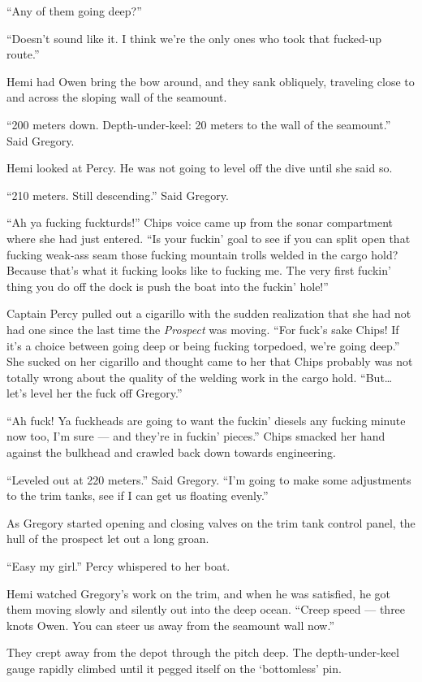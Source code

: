 \documentclass[
]{scrbook}
\begin{document}
``Any of them going deep?''

``Doesn't sound like it. I think we're the only ones who took that
fucked-up route.''

Hemi had Owen bring the bow around, and they sank obliquely, traveling
close to and across the sloping wall of the seamount.

``200 meters down. Depth-under-keel: 20 meters to the wall of the
seamount.'' Said Gregory.

Hemi looked at Percy. He was not going to level off the dive until she
said so.

``210 meters. Still descending.'' Said Gregory.

``Ah ya fucking fuckturds!'' Chips voice came up from the sonar
compartment where she had just entered. ``Is your fuckin' goal to see if
you can split open that fucking weak-ass seam those fucking mountain
trolls welded in the cargo hold? Because that's what it fucking looks
like to fucking me. The very first fuckin' thing you do off the dock is
push the boat into the fuckin' hole!''

Captain Percy pulled out a cigarillo with the sudden realization that
she had not had one since the last time the \emph{Prospect} was moving.
``For fuck's sake Chips! If it's a choice between going deep or being
fucking torpedoed, we're going deep.'' She sucked on her cigarillo and
thought came to her that Chips probably was not totally wrong about the
quality of the welding work in the cargo hold. ``But\ldots{} let's level
her the fuck off Gregory.''

``Ah fuck! Ya fuckheads are going to want the fuckin' diesels any
fucking minute now too, I'm sure --- and they're in fuckin' pieces.''
Chips smacked her hand against the bulkhead and crawled back down
towards engineering.

``Leveled out at 220 meters.'' Said Gregory. ``I'm going to make some
adjustments to the trim tanks, see if I can get us floating evenly.''

As Gregory started opening and closing valves on the trim tank control
panel, the hull of the prospect let out a long groan.

``Easy my girl.'' Percy whispered to her boat.

Hemi watched Gregory's work on the trim, and when he was satisfied, he
got them moving slowly and silently out into the deep ocean. ``Creep
speed --- three knots Owen. You can steer us away from the seamount wall
now.''

They crept away from the depot through the pitch deep. The
depth-under-keel gauge rapidly climbed until it pegged itself on the
`bottomless' pin.
\end{document}
